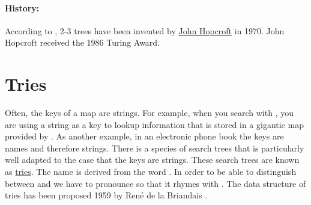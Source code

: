 \paragraph{History:}
According to \cite{cormen:09}, 2-3 trees have been invented by
\href{https://en.wikipedia.org/wiki/John_Hopcroft}{John Hopcroft} in 1970.  John Hopcroft received the 1986
Turing Award. 



\section{Tries}
Often, the keys of a map are strings.  For example, when you search with 
\href{https://www.google.com}{}, you are using
a string as a key to lookup information that is stored in a gigantic map provided by .
As another example, in an electronic phone book the keys are names and therefore strings.  
There is a species of search trees that is particularly well adapted to the case that the keys are
strings.  These search trees are known as \href{https://en.wikipedia.org/?title=Trie}{tries}.  
The name is derived from the word
.  In order to be able to distinguish between  and
 we have to pronounce    so that it rhymes with .   The data
structure of tries has been proposed 1959 by Ren\'e de la Briandais \cite{briandais:59}.

